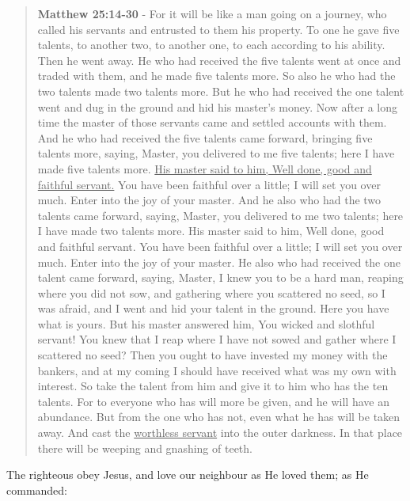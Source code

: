 \documentclass[11pt]{article}
\begin{document}
\begin{quote}
\textbf{Matthew 25:14-30} - For it will be like a man going on a journey, who called his servants and entrusted to them his property. To one he gave five talents, to another two, to another one, to each according to his ability. Then he went away. He who had received the five talents went at once and traded with them, and he made five talents more. So also he who had the two talents made two talents more. But he who had received the one talent went and dug in the ground and hid his master's money. Now after a long time the master of those servants came and settled accounts with them. And he who had received the five talents came forward, bringing five talents more, saying, Master, you delivered to me five talents; here I have made five talents more. \uline{His master said to him, Well done, good and faithful servant.} You have been faithful over a little; I will set you over much. Enter into the joy of your master. And he also who had the two talents came forward, saying, Master, you delivered to me two talents; here I have made two talents more. His master said to him, Well done, good and faithful servant. You have been faithful over a little; I will set you over much. Enter into the joy of your master. He also who had received the one talent came forward, saying, Master, I knew you to be a hard man, reaping where you did not sow, and gathering where you scattered no seed, so I was afraid, and I went and hid your talent in the ground. Here you have what is yours. But his master answered him, You wicked and slothful servant! You knew that I reap where I have not sowed and gather where I scattered no seed? Then you ought to have invested my money with the bankers, and at my coming I should have received what was my own with interest. So take the talent from him and give it to him who has the ten talents. For to everyone who has will more be given, and he will have an abundance. But from the one who has not, even what he has will be taken away. And cast the \uline{worthless servant} into the outer darkness. In that place there will be weeping and gnashing of teeth.
\end{quote}

The righteous obey Jesus, and love our neighbour as He loved them; as He commanded:
\end{document}
